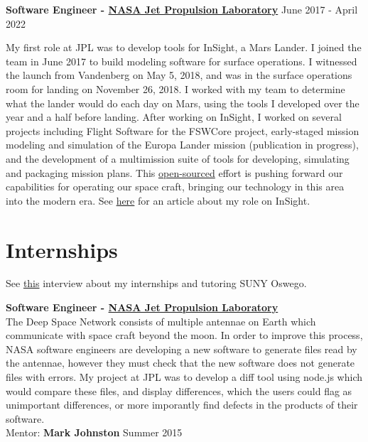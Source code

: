 \documentclass[8pt]{article}
\renewenvironment{itemize}{
  \begin{list}{}{
    \setlength{\leftmargin}{1.5em}
  }
}{
  \end{list}
}
\begin{document}
\textbf{Software Engineer - \href{https://www.jpl.nasa.gov/}{NASA Jet Propulsion Laboratory}} \hfill June 2017 - April 2022

My first role at JPL was to develop tools for InSight, a Mars Lander. I joined the team in June 2017 to build modeling software for surface operations. I witnessed the launch from Vandenberg on May 5, 2018, and was in the surface operations room for landing on November 26, 2018. I worked with my team to determine what the lander would do each day on Mars, using the tools I developed over the year and a half before landing. After working on InSight, I worked on several projects including Flight Software for the FSWCore project, early-staged mission modeling and simulation of the Europa Lander mission (publication in progress), and the development of a multimission suite of tools for developing, simulating and packaging mission plans. This \href{https://github.com/NASA-AMMOS/aerie}{open-sourced} effort is pushing forward our capabilities for operating our space craft, bringing our technology in this area into the modern era. See \href{http://www.oswegocountynewsnow.com/news/mars-landing-puts-phoenix-native-suny-oswego-grad-roffo-among/article_968bd574-f34c-11e8-8c5b-b7d557e9f682.html?fbclid=IwAR1iCW3CdQIRr2JIy1f96utXjzzidSJ6vA13jVgvkjKIU6PopaLHYkpbQrw}{here} for an article about my role on InSight.


\section*{Internships} See \href{https://www.youtube.com/watch?v=BiJOjhm_ov4}{this} interview about my internships and tutoring SUNY Oswego.
\begin{itemize}
\item \textbf{Software Engineer - \href{https://www.jpl.nasa.gov/}{NASA Jet Propulsion Laboratory}}\\
  The Deep Space Network consists of multiple antennae on Earth which communicate with space craft beyond the moon. In order to improve this process, NASA software engineers are developing a new software to generate files read by the antennae, however they must check that the new software does not generate files with errors. My project at JPL was to develop a diff tool using node.js which would compare these files, and display differences, which the users could flag as unimportant differences, or more imporantly find defects in the products of their software.\\
  Mentor: \textbf{Mark Johnston} \hfill Summer 2015


\end{itemize}
\end{document}
